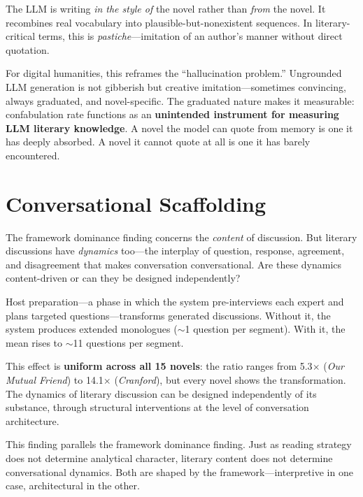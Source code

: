 \documentclass[final]{clv2025}
\begin{document}
The LLM is writing \emph{in the style of} the novel rather than
\emph{from} the novel.  It recombines real vocabulary into
plausible-but-nonexistent sequences.  In literary-critical terms, this
is \emph{pastiche}---imitation of an author's manner without direct
quotation.

For digital humanities, this reframes the ``hallucination problem.''
Ungrounded LLM generation is not gibberish but creative
imitation---sometimes convincing, always graduated, and
novel-specific.  The graduated nature makes it measurable: confabulation
rate functions as an \textbf{unintended instrument for measuring LLM
literary knowledge}.  A novel the model can quote from memory is one it
has deeply absorbed.  A novel it cannot quote at all is one it has
barely encountered.


\section{Conversational Scaffolding}
\label{sec:scaffolding}

The framework dominance finding concerns the \emph{content} of discussion.
But literary discussions have \emph{dynamics} too---the interplay of
question, response, agreement, and disagreement that makes conversation
conversational.  Are these dynamics content-driven or can they be
designed independently?

Host preparation---a phase in which the system pre-interviews each
expert and plans targeted questions---transforms generated discussions.
Without it, the system produces extended monologues ($\sim$1 question
per segment).  With it, the mean rises to $\sim$11 questions per
segment.

This effect is \textbf{uniform across all 15 novels}: the ratio ranges
from 5.3$\times$ (\textit{Our Mutual Friend}) to 14.1$\times$
(\textit{Cranford}), but every novel shows the transformation.  The
dynamics of literary discussion can be designed independently of its
substance, through structural interventions at the level of
conversation architecture.

This finding parallels the framework dominance finding.  Just as reading
strategy does not determine analytical character, literary content does
not determine conversational dynamics.  Both are shaped by the
framework---interpretive in one case, architectural in the other.


\end{document}
